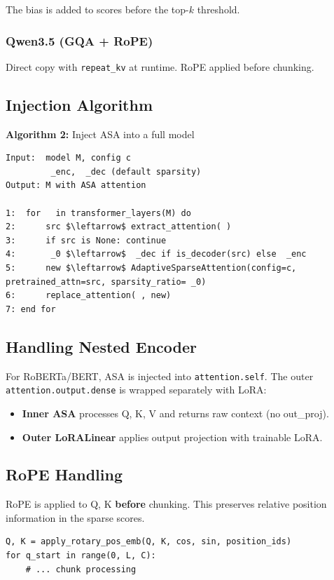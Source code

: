 The bias is added to scores before the top-$k$ threshold.

\subsubsection{Qwen3.5 (GQA + RoPE)}

Direct copy with \texttt{repeat\_kv} at runtime. RoPE applied before chunking.

\subsection{Injection Algorithm}

\textbf{Algorithm 2:} Inject ASA into a full model
\begin{lstlisting}
Input:  model M, config c
         _enc,  _dec (default sparsity)
Output: M with ASA attention

1:  for   in transformer_layers(M) do
2:      src $\leftarrow$ extract_attention( )
3:      if src is None: continue
4:       _0 $\leftarrow$  _dec if is_decoder(src) else  _enc
5:      new $\leftarrow$ AdaptiveSparseAttention(config=c, pretrained_attn=src, sparsity_ratio= _0)
6:      replace_attention( , new)
7: end for
\end{lstlisting}

\subsection{Handling Nested Encoder}

For RoBERTa/BERT, ASA is injected into \texttt{attention.self}. The outer 
\texttt{attention.output.dense} is wrapped separately with LoRA:

\begin{itemize}
\item \textbf{Inner ASA} processes Q, K, V and returns raw context (no out\_proj).
\item \textbf{Outer LoRALinear} applies output projection with trainable LoRA.

\end{itemize}
\subsection{RoPE Handling}

RoPE is applied to Q, K \textbf{before} chunking. This preserves relative 
position information in the sparse scores.

\begin{lstlisting}
Q, K = apply_rotary_pos_emb(Q, K, cos, sin, position_ids)
for q_start in range(0, L, C):
    # ... chunk processing
\end{lstlisting}

